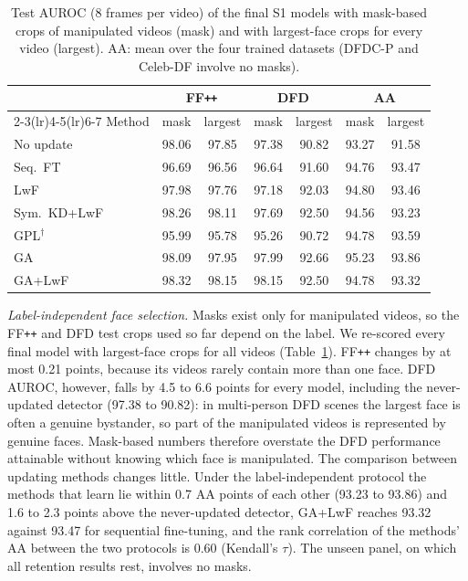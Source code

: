 \documentclass[journal]{IEEEtran}
\newcommand{\ffpp}{FF\texttt{++}}
\begin{document}
\begin{table}[t]
\caption{Test AUROC (8 frames per video) of the final S1 models with mask-based crops of manipulated videos (mask) and with largest-face crops for every video (largest). AA: mean over the four trained datasets (DFDC-P and Celeb-DF involve no masks).}
\label{tab:labelindep}
\centering
\footnotesize
\setlength{\tabcolsep}{2.6pt}
\begin{tabular}{@{}lcccccc@{}}
\toprule
& \multicolumn{2}{c}{\ffpp{}} & \multicolumn{2}{c}{DFD} & \multicolumn{2}{c}{AA} \\
\cmidrule(lr){2-3}\cmidrule(lr){4-5}\cmidrule(lr){6-7}
Method & mask & largest & mask & largest & mask & largest \\
\midrule
No update & 98.06 & 97.85 & 97.38 & 90.82 & 93.27 & 91.58 \\
Seq.\ FT & 96.69 & 96.56 & 96.64 & 91.60 & 94.76 & 93.47 \\
LwF & 97.98 & 97.76 & 97.18 & 92.03 & 94.80 & 93.46 \\
Sym.\ KD+LwF & 98.26 & 98.11 & 97.69 & 92.50 & 94.56 & 93.23 \\
GPL$^\dagger$ & 95.99 & 95.78 & 95.26 & 90.72 & 94.78 & 93.59 \\
GA & 98.09 & 97.95 & 97.99 & 92.66 & 95.23 & 93.86 \\
GA+LwF & 98.32 & 98.15 & 98.15 & 92.50 & 94.78 & 93.32 \\
\bottomrule
\end{tabular}
\end{table}

\textit{Label-independent face selection.}\label{sec:labelindep} Masks exist only for manipulated videos, so the \ffpp{} and DFD test crops used so far depend on the label. We re-scored every final model with largest-face crops for all videos (Table~\ref{tab:labelindep}). \ffpp{} changes by at most 0.21 points, because its videos rarely contain more than one face. DFD AUROC, however, falls by 4.5 to 6.6 points for every model, including the never-updated detector (97.38 to 90.82): in multi-person DFD scenes the largest face is often a genuine bystander, so part of the manipulated videos is represented by genuine faces. Mask-based numbers therefore overstate the DFD performance attainable without knowing which face is manipulated. The comparison between updating methods changes little. Under the label-independent protocol the methods that learn lie within 0.7 AA points of each other (93.23 to 93.86) and 1.6 to 2.3 points above the never-updated detector, GA+LwF reaches 93.32 against 93.47 for sequential fine-tuning, and the rank correlation of the methods' AA between the two protocols is 0.60 (Kendall's $\tau$). The unseen panel, on which all retention results rest, involves no masks.
\end{document}
